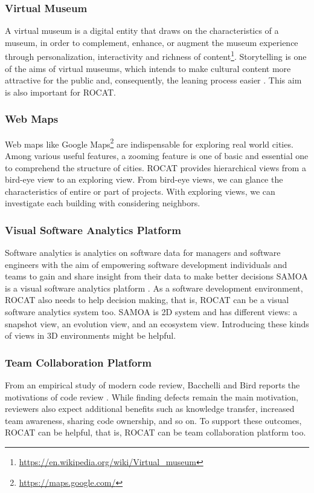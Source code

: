 \documentclass[conference]{IEEEtran}
\begin{document}
\subsubsection{Virtual Museum}
A virtual museum is a digital entity that draws on the characteristics of a museum, in order to complement, enhance, or augment the museum
experience through personalization, interactivity and richness of content\footnote{\url{https://en.wikipedia.org/wiki/Virtual_museum}}.
Storytelling is one of the aims of virtual museums, which intends to make cultural content more attractive for the public and, consequently, the leaning process easier \cite{Pietroni:2014:IVR:2635823.2611375}.
This aim is also important for ROCAT.

\subsubsection{Web Maps}
Web maps like Google Maps\footnote{\url{https://maps.google.com/}} are indispensable for exploring real world cities.
Among various useful features, a zooming feature is one of basic and essential one to comprehend the structure of cities.
ROCAT provides hierarchical views from a bird-eye view to an exploring view.
From bird-eye views, we can glance the characteristics of entire or part of projects.
With exploring views, we can investigate each building with considering neighbors.

\subsubsection{Visual Software Analytics Platform}
Software analytics is analytics on software data for managers and software engineers with the aim of empowering software development individuals and teams to gain and share insight from their data to make better decisions \cite{Menzies:2013:SAS:2553351.2553360} SAMOA is a visual software analytics platform \cite{6676936}.
As a software development environment, ROCAT also needs to help decision making, that is, ROCAT can be a visual software analytics system too.
SAMOA is 2D system and has different views: a snapshot view, an evolution view, and an ecosystem view.
Introducing these kinds of views in 3D environments might be helpful.

\subsubsection{Team Collaboration Platform}
From an empirical study of modern code review, Bacchelli and Bird reports the motivations of code review \cite{Bacchelli:2013:EOC:2486788.2486882}. While finding defects remain the main motivation, reviewers also expect additional benefits such as knowledge transfer, increased team awareness, sharing code ownership, and so on.
To support these outcomes, ROCAT can be helpful, that is, ROCAT can be team collaboration platform too.
\end{document}
